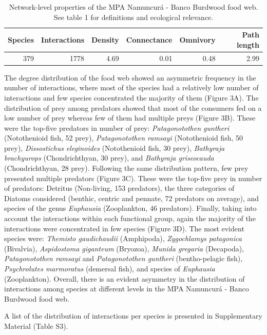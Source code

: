 \documentclass[preprint, 3p,
authoryear]{elsarticle} %
\begin{document}
\begin{table}

\caption{\label{tab:table2}Network-level properties of the MPA Namuncurá - Banco Burdwood food web. See table 1 for definitions and ecological relevance.}
\centering
\begin{tabular}[t]{r|r|r|r|r|r}
\hline
\textbf{Species} & \textbf{Interactions} & \textbf{Density} & \textbf{Connectance} & \textbf{Omnivory} & \textbf{Path length}\\
\hline
379 & 1778 & 4.69 & 0.01 & 0.48 & 2.99\\
\hline
\end{tabular}
\end{table}

The degree distribution of the food web showed an asymmetric frequency
in the number of interactions, where most of the species had a
relatively low number of interactions and few species concentrated the
majority of them (Figure 3A). The distribution of prey among predators
showed that most of the consumers fed on a low number of prey whereas
few of them had multiple preys (Figure 3B). These were the top-five
predators in number of prey: \emph{Patagonotothen guntheri}
(Notothenioid fish, 52 prey), \emph{Patagonotothen ramsayi}
(Notothenioid fish, 50 prey), \emph{Dissostichus eleginoides}
(Notothenioid fish, 30 prey), \emph{Bathyraja brachyurops}
(Chondrichthyan, 30 prey), and \emph{Bathyraja griseocauda}
(Chondrichthyan, 28 prey). Following the same distribution pattern, few
prey presented multiple predators (Figure 3C). These were the top-five
prey in number of predators: Detritus (Non-living, 153 predators), the
three categories of Diatoms considered (benthic, centric and pennate, 72
predators on average), and species of the genus \emph{Euphausia}
(Zooplankton, 46 predators). Finally, taking into account the
interactions within each functional group, again the majority of the
interactions were concentrated in few species (Figure 3D). The most
evident species were: \emph{Themisto gaudichaudii} (Amphipoda),
\emph{Zygochlamys patagonica} (Bivalvia), \emph{Aspidostoma giganteum}
(Bryozoa), \emph{Munida gregaria} (Decapoda), \emph{Patagonotothen
ramsayi} and \emph{Patagonotothen guntheri} (bentho-pelagic fish),
\emph{Psychrolutes marmoratus} (demersal fish), and species of
\emph{Euphausia} (Zooplankton). Overall, there is an evident asymmetry
in the distribution of interactions among species at different levels in
the MPA Namuncurá - Banco Burdwood food web.

A list of the distribution of interactions per species is presented in
Supplementary Material (Table S3).
\end{document}
